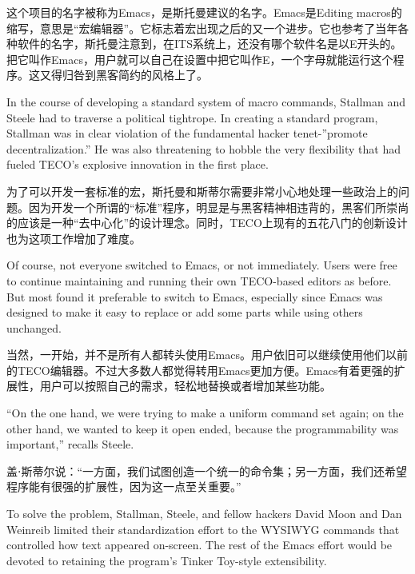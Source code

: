 \ifdefined\chs
这个项目的名字被称为Emacs，是斯托曼建议的名字。Emacs是Editing macros的缩写，意思是``宏编辑器''。它标志着宏出现之后的又一个进步。它也参考了当年各种软件的名字，斯托曼注意到，在ITS系统上，还没有哪个软件名是以E开头的。把它叫作Emacs，用户就可以自己在设置中把它叫作E，一个字母就能运行这个程序。这又得归咎到黑客简约的风格上了。
\fi

\ifdefined\vone
\ifdefined\eng
In the course of developing a standard system of macro commands, Stallman and Steele had to traverse a political tightrope. In creating a standard program, Stallman was in clear violation of the fundamental hacker tenet-''promote decentralization.'' He was also threatening to hobble the very flexibility that had fueled TECO's explosive innovation in the first place.
\fi

\ifdefined\chs
为了可以开发一套标准的宏，斯托曼和斯蒂尔需要非常小心地处理一些政治上的问题。因为开发一个所谓的``标准''程序，明显是与黑客精神相违背的，黑客们所崇尚的应该是一种``去中心化''的设计理念。同时，TECO上现有的五花八门的创新设计也为这项工作增加了难度。
\fi
\fi

\ifdefined\vtwo
\ifdefined\eng
Of course, not everyone switched to Emacs, or not immediately.  Users were free to continue maintaining and running their own TECO-based editors as before.  But most found it preferable to switch to Emacs, especially since Emacs was designed to make it easy to replace or add some parts while using others unchanged.
\fi

\ifdefined\chs
当然，一开始，并不是所有人都转头使用Emacs。用户依旧可以继续使用他们以前的TECO编辑器。不过大多数人都觉得转用Emacs更加方便。Emacs有着更强的扩展性，用户可以按照自己的需求，轻松地替换或者增加某些功能。
\fi
\fi

\ifdefined\eng
``On the one hand, we were trying to make a uniform command set again; on the other hand, we wanted to keep it open ended, because the programmability was important,'' recalls Steele.
\fi

\ifdefined\chs
盖⋅斯蒂尔说：``一方面，我们试图创造一个统一的命令集；另一方面，我们还希望程序能有很强的扩展性，因为这一点至关重要。''
\fi

\ifdefined\vone
\ifdefined\eng
To solve the problem, Stallman, Steele, and fellow hackers David Moon and Dan Weinreib limited their standardization effort to the WYSIWYG commands that controlled how text appeared on-screen. The rest of the Emacs effort would be devoted to retaining the program's Tinker Toy-style extensibility.
\fi

